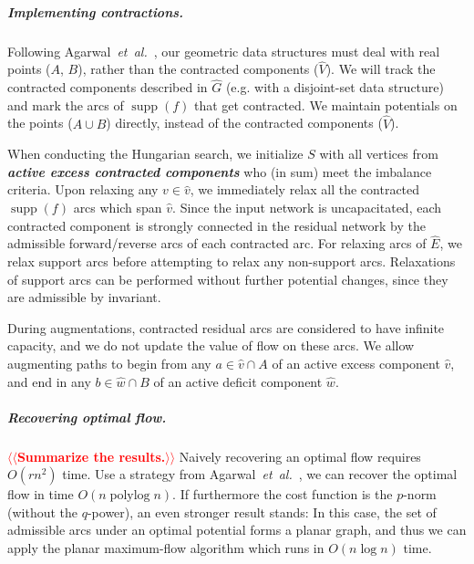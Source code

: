 \documentclass[a4paper,UKenglish]{socg-lipics-v2018}
\makeatletter
\def\note#1{\textcolor{red}{{#1}}}
\def\etal{\emph{et~al.}}
\def\etal{\textit{et~al.}}
\def\polylog{\mathop{\mathrm{polylog}}}
\def\supp{\operatorname{supp}}
\theoremstyle{plain}
\numberwithin{figure}{section}
\renewcommand{\paragraph}{\subparagraph}
\def\EMPH#1{\textbf{\emph{\boldmath #1}}}
\def\n@te#1{\textsf{\boldmath \textbf{$\langle\!\langle$#1$\rangle\!\rangle$}}\leavevmode}
\def\note#1{\textcolor{red}{\n@te{#1}}}
\makeatother
\begin{document}
\paragraph{Implementing contractions.}
Following Agarwal~\etal~\cite{AFPVX17}, our geometric data structures must deal
with real points ($A$, $B$), rather than the contracted components ($\hat{V}$).
We will track the contracted components described in $\hat{G}$ (e.g. with a
disjoint-set data structure) and mark the arcs of $\supp(f)$ that get
contracted.
We maintain potentials on the points ($A \cup B$) directly, instead of the
contracted components ($\hat{V}$).

When conducting the Hungarian search, we initialize $S$ with all vertices from
\EMPH{active excess contracted components} who (in sum) meet the imbalance
criteria.
Upon relaxing any $v \in \hat{v}$, we immediately relax all the contracted
$\supp(f)$ arcs which span $\hat{v}$.
Since the input network is uncapacitated, each contracted component is
strongly connected in the residual network by the admissible forward/reverse
arcs of each contracted arc.
For relaxing arcs of $\hat{E}$, we relax support arcs before attempting to
relax any non-support arcs.
Relaxations of support arcs can be performed without further potential changes,
since they are admissible by invariant.

During augmentations, contracted residual arcs are considered to have infinite
capacity, and we do not update the value of flow on these arcs.
We allow augmenting paths to begin from any $a \in \hat{v} \cap A$ of an active
excess component $\hat{v}$, and end in any $b \in \hat{w} \cap B$ of an active
deficit component $\hat{w}$.

\paragraph{Recovering optimal flow.}
\note{Summarize the results.}
Naively recovering an optimal flow requires $O(rn^2)$ time.
Use a strategy from Agarwal~\etal~\cite{AFPVX17}, we can recover the optimal flow in time $O(n \polylog n)$.
If furthermore the cost function is the $p$-norm (without the $q$-power), an even stronger result stands:
In this case, the set of admissible arcs under an optimal potential forms a planar graph, and thus we can apply the planar maximum-flow algorithm \cite{E10,xxx} which runs in $O(n \log n)$ time.
\end{document}

